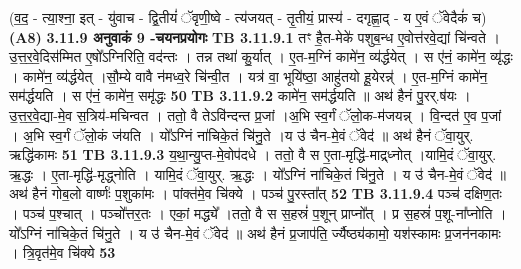 \documentclass[17pt]{extarticle}
\begin{document}
{{{{{{{{{{{{{{{{{{{{{{                  \newline
                                    (व॒द॒ - त्या॒श्ना॒ इत् - यु॑वाच - द्वि॒तीयं॑ ॅवृणी॒ष्वे - त्य॑जयत् - तृ॒तीयं॒ प्रास्य॑ - दगृह्णा॒द् - य ए॒वं ॅवेदैकं॑ च) \textbf{(A8)} \newline \newline
                \textbf{ 3.11.9    अनुवाकं   9 -चयनप्रयोगः} \newline
                                \textbf{ TB 3.11.9.1} \newline
                  तꣳ है॒त-मेके॑ पशुब॒न्ध ए॒वोत्त॑रवे॒द्यां चि॑न्वते । उ॒त्त॒र॒वे॒दिस॑म्मित ए॒षो᳚ऽग्निरिति॒ वद॑न्तः । तन्न तथा॑ कु॒र्यात् । ए॒त-म॒ग्निं कामे॑न॒ व्य॑र्द्धयेत् । स ए॑नं॒ कामे॑न॒ व्यृ॑द्धः । कामे॑न॒ व्य॑र्द्धयेत् ।सौ॒म्ये वावै न॑मध्व॒रे चि॑न्वी॒त । यत्र॑ वा॒ भूयि॑ष्ठा॒ आहु॑तयो हू॒येरन्न्॑ । ए॒त-म॒ग्निं कामे॑न॒ सम॑र्द्धयति । स ए॑नं॒ कामे॑न॒ समृ॑द्धः \textbf{ 50} \newline
                  \newline
                                \textbf{ TB 3.11.9.2} \newline
                  कामे॑न॒ सम॑र्द्धयति ॥ अथ॑ हैनं पु॒रर्.ष॑यः । उ॒त्त॒र॒वे॒द्या-मे॒व स॒त्रिय॑-मचिन्वत । ततो॒ वै तेऽवि॑न्दन्त प्र॒जां ।अ॒भि स्व॒र्गं ॅलो॒क-म॑जयन्न् । वि॒न्दत॑ ए॒व प॒जां । अ॒भि स्व॒र्गं ॅलो॒कं ज॑यति । यो᳚ऽग्निं ना॑चिके॒तं चि॑नु॒ते ।य उ॑ चैन-मे॒वं ॅवेद॑ ॥ अथ॑ हैनं ॅवा॒युर्. ऋद्धि॑कामः \textbf{ 51} \newline
                  \newline
                                \textbf{ TB 3.11.9.3} \newline
                  य॒था॒न्यु॒प्त-मे॒वोप॑दधे । ततो॒ वै स ए॒ता-मृद्धि॑-माद्र्ध्नोत् ।यामि॒दं ॅवा॒युर्. ऋ॒द्धः । ए॒ता-मृद्धि॑-मृद्ध्नोति । यामि॒दं ॅवा॒युर्. ऋ॒द्धः । यो᳚ऽग्निं ना॑चिके॒तं चि॑नु॒ते । य उ॑ चैन-मे॒वं ॅवेद॑ ॥ अथ॑ हैनं गोब॒लो वार्ष्णः॑ प॒शुका॑मः । पांक्त॑मे॒व चि॑क्ये । पञ्च॑ पु॒रस्ता᳚त् \textbf{ 52} \newline
                  \newline
                                \textbf{ TB 3.11.9.4} \newline
                  पञ्च॑ दक्षिण॒तः । पञ्च॑ प॒श्चात् । पञ्चो᳚त्तर॒तः । एकां॒ मद्ध्ये᳚ ।ततो॒ वै स स॒हस्रं॑ प॒शून् प्राप्नो᳚त् । प्र स॒हस्रं॑ प॒शू-ना᳚प्नोति ।यो᳚ऽग्निं ना॑चिके॒तं चि॑नु॒ते । य उ॑ चैन-मे॒वं ॅवेद॑ ॥ अथ॑ हैनं प्र॒जाप॑ति॒ र्ज्यैष्ठ्य॑कामो॒ यश॑स्कामः प्र॒जन॑नकामः । त्रि॒वृत॑मे॒व चि॑क्ये \textbf{ 53} \newline
                  \newline
}}}}}}}}}}}}}}}}}}}}}}
\end{document}
